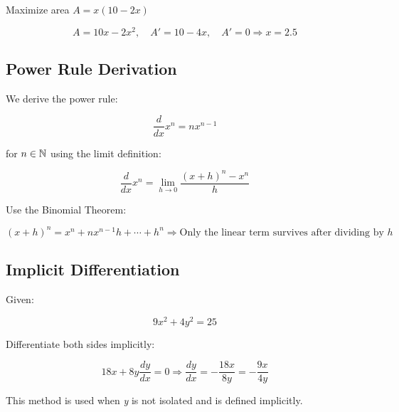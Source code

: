 Maximize area \(A = x(10 - 2x)\)

\[
    A = 10x - 2x^2, \quad A' = 10 - 4x, \quad A' = 0 \Rightarrow x = 2.5
\]

\subsection{Power Rule Derivation}

We derive the power rule:


\[
    \frac{d}{dx} x^n = nx^{n - 1}
\]

for \(n \in \mathbb{N}\) using the limit definition:

\[
    \frac{d}{dx} x^n = \lim_{h \to 0} \frac{{(x + h)}^n - x^n}{h}
\]

Use the Binomial Theorem:

\[
    {(x + h)}^n = x^n + nx^{n-1}h + \cdots + h^n
    \Rightarrow \text{Only the linear term survives after dividing by } h
\]

\subsection{Implicit Differentiation}

Given:

\[
    9x^2 + 4y^2 = 25
\]

Differentiate both sides implicitly:

\[
    18x + 8y \frac{dy}{dx} = 0
    \Rightarrow \frac{dy}{dx} = -\frac{18x}{8y} = -\frac{9x}{4y}
\]

This method is used when \emph{y} is not isolated and is defined implicitly.

